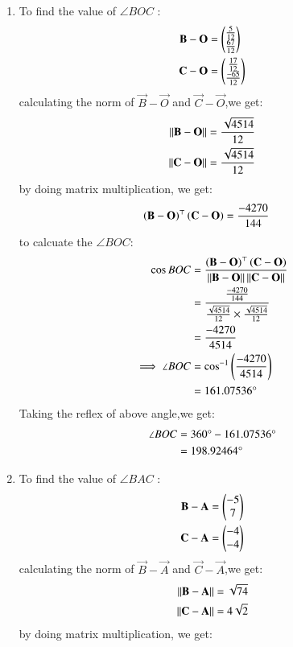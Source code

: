 \documentclass[journal,12pt,twocolumn]{IEEEtran}
\theoremstyle{remark}
\begin{document}
\begin{enumerate}
\item To find  the value of $\angle{BOC}$ :
\begin{align}
\mathbf{B}-\mathbf{O}
          &=\begin{pmatrix}\frac{5}{12}\\\frac{67}{12}\end{pmatrix}\\
\mathbf{C}-\mathbf{O}
          &=\begin{pmatrix}\frac{17}{12}\\\frac{-65}{12}\end{pmatrix}
\end{align}
calculating the norm of $\vec{B}-\vec{O}$ and $\vec{C}-\vec{O}$,we get:
\begin{align}
	\left\lVert\mathbf{B}-\mathbf{O}\right\rVert&= \frac{\sqrt{4514}}{12}\\
	\left\lVert\mathbf{C}-\mathbf{O}\right\rVert&= \frac{\sqrt{4514}}{12}
\end{align}
by doing matrix multiplication, we get:
\begin{align}
\left(\mathbf{B}-\mathbf{O}\right)^{\top}\left(\mathbf{C}-\mathbf{O}\right)&=\frac{-4270}{144}
\end{align}
to calcuate the $\angle{BOC}$:
\begin{align}
\cos{BOC}&=\frac{\left(\mathbf{B}-\mathbf{O}\right)^{\top}\left(\mathbf{C}-\mathbf{O}\right)}{\left\lVert\mathbf{B}-\mathbf{O}\right\rVert\left\lVert\mathbf{C}-\mathbf{O}\right\rVert}\\
&=\frac{\frac{-4270}{144}}{\frac{\sqrt{4514}}{12}\times\frac{\sqrt{4514}}{12}}\\
&=\frac{-4270}{4514}\\
\implies\angle{BOC}&=\cos^{-1}\left(\frac{-4270}{4514}\right)\\
&=161.07536\degree
\end{align}
Taking the reflex of above angle,we get:
\begin{align}
\angle{BOC}&=360\degree-161.07536\degree\\&=198.92464\degree\label{eq:1}
\end{align}
	\item To find  the value of $\angle{BAC}$ :
\begin{align}
\mathbf{B}-\mathbf{A}&=\begin{pmatrix}-5\\7\end{pmatrix}\\
\mathbf{C}-\mathbf{A}&=\begin{pmatrix}-4\\-4\end{pmatrix}
\end{align}
calculating the norm of $\vec{B}-\vec{A}$ and $\vec{C}-\vec{A}$,we get:
\begin{align}
	\left\lVert\mathbf{B}-\mathbf{A}\right\rVert&= \sqrt{74}\\
	\left\lVert\mathbf{C}-\mathbf{A}\right\rVert&= 4\sqrt{2}
\end{align}
by doing matrix multiplication, we get:
\begin{align}

\end{align}
\end{enumerate}
\end{document}

